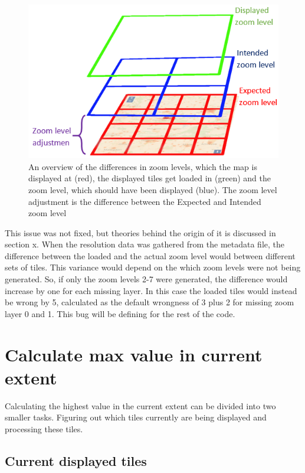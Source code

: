 \begin{figure} [H]
	\centering
	\includegraphics[width=.6\textwidth]{Pictures/DifferentZoom}
	\caption{An overview of the differences in zoom levels, which the map is displayed at (red), the displayed tiles get loaded in (green) and the zoom level, which should have been displayed (blue). The zoom level adjustment is the difference between the Expected and Intended zoom level}
	\label{DifferentZoom}
\end{figure}
This issue was not fixed, but theories behind the origin of it is discussed in section x. When the resolution data was gathered from the metadata file, the difference between the loaded and the actual zoom level would between different sets of tiles. This variance would depend on the which zoom levels were not being generated. So, if only the zoom levels 2-7 were generated, the difference would increase by one for each missing layer. In this case the loaded tiles would instead be wrong by 5, calculated as the default wrongness of 3 plus 2 for missing zoom layer 0 and 1. 
This bug will be defining for the rest of the code.



\section{Calculate max value in current extent}
Calculating the highest value in the current extent can be divided into two smaller tasks. Figuring out which tiles currently are being displayed and processing these tiles. 


\subsection{Current displayed tiles}\label{CurrentDisplayedTiles}

